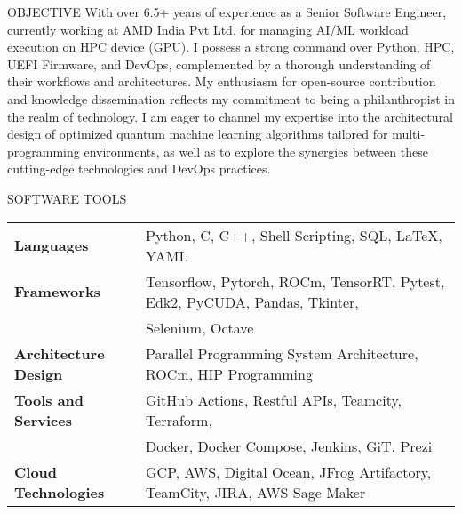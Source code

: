 \documentclass{resume} %
\begin{document}

\begin{rSection}{OBJECTIVE}
{With over 6.5+ years of experience as a Senior Software Engineer, currently working at AMD India Pvt Ltd. for managing AI/ML workload execution on HPC device (GPU). I possess a strong command over Python, HPC, UEFI Firmware, and DevOps, complemented by a thorough understanding of their workflows and architectures. My enthusiasm for open-source contribution and knowledge dissemination reflects my commitment to being a philanthropist in the realm of technology. I am eager to channel my expertise into the architectural design of optimized quantum machine learning algorithms tailored for multi-programming environments, as well as to explore the synergies between these cutting-edge technologies and DevOps practices.}

\end{rSection}





\begin{rSection}{SOFTWARE TOOLS}

\begin{tabular}{ @{} >{\bfseries}l @{\hspace{6ex}} l }

Languages & Python, C, C++, Shell Scripting, SQL, LaTeX, YAML 
\\
Frameworks & Tensorflow, Pytorch, ROCm, TensorRT, Pytest, Edk2, PyCUDA, Pandas, Tkinter, 
\\ & Selenium, Octave 
\\
Architecture Design & Parallel Programming System Architecture, ROCm, HIP Programming
\\
Tools and Services & GitHub Actions, Restful APIs, Teamcity, Terraform,
\\ & Docker, Docker Compose, Jenkins, GiT, Prezi 
\\
Cloud Technologies & GCP, AWS, Digital Ocean, JFrog Artifactory, TeamCity, JIRA, AWS Sage Maker

\end{tabular}

\end{rSection}
\end{document}
